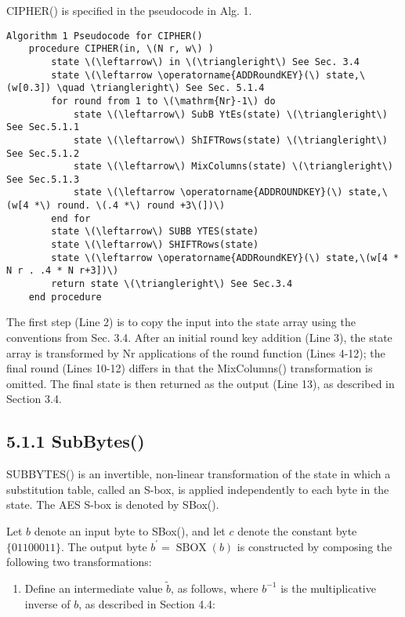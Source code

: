 CIPHER() is specified in the pseudocode in Alg. 1.

\begin{verbatim}
Algorithm 1 Pseudocode for CIPHER()
    procedure CIPHER(in, \(N r, w\) )
        state \(\leftarrow\) in \(\triangleright\) See Sec. 3.4
        state \(\leftarrow \operatorname{ADDRoundKEY}(\) state,\(w[0.3]) \quad \triangleright\) See Sec. 5.1.4
        for round from 1 to \(\mathrm{Nr}-1\) do
            state \(\leftarrow\) SubB YtEs(state) \(\triangleright\) See Sec.5.1.1
            state \(\leftarrow\) ShIFTRows(state) \(\triangleright\) See Sec.5.1.2
            state \(\leftarrow\) MixColumns(state) \(\triangleright\) See Sec.5.1.3
            state \(\leftarrow \operatorname{ADDROUNDKEY}(\) state,\(w[4 *\) round. \(.4 *\) round +3\(])\)
        end for
        state \(\leftarrow\) SUBB YTES(state)
        state \(\leftarrow\) SHIFTRows(state)
        state \(\leftarrow \operatorname{ADDRoundKEY}(\) state,\(w[4 * N r . .4 * N r+3])\)
        return state \(\triangleright\) See Sec.3.4
    end procedure
\end{verbatim}

The first step (Line 2) is to copy the input into the state array using the conventions from Sec. 3.4. After an initial round key addition (Line 3), the state array is transformed by Nr applications of the round function (Lines 4-12); the final round (Lines 10-12) differs in that the MixColumns() transformation is omitted. The final state is then returned as the output (Line 13), as described in Section 3.4.

\subsection*{5.1.1 SubBytes()}

SUBBYTES() is an invertible, non-linear transformation of the state in which a substitution table, called an S-box, is applied independently to each byte in the state. The AES S-box is denoted by SBox().

Let \(b\) denote an input byte to SBox(), and let \(c\) denote the constant byte \(\{01100011\}\). The output byte \(b^{\prime}=\operatorname{SBOX}(b)\) is constructed by composing the following two transformations:

\begin{enumerate}
  \item Define an intermediate value \(\tilde{b}\), as follows, where \(b^{-1}\) is the multiplicative inverse of \(b\), as described in Section 4.4:
\end{enumerate}

